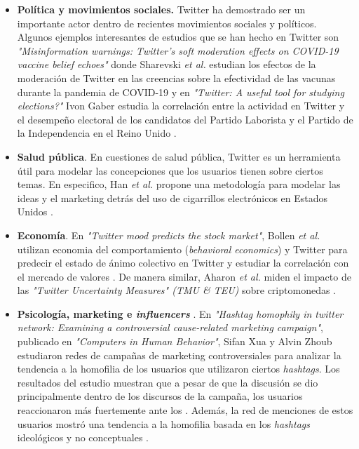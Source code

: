 \begin{itemize}

    \item \textbf{Política y movimientos sociales.} Twitter ha demostrado ser un importante actor dentro de recientes movimientos sociales y políticos. Algunos ejemplos interesantes de estudios que se han hecho en Twitter son \textit{"Misinformation warnings: Twitter’s soft moderation effects on COVID-19 vaccine belief echoes"} donde Sharevski \textit{et al.} estudian los efectos de la moderación de Twitter en las creencias sobre la efectividad de las vacunas durante la pandemia de COVID-19 \cite{sharevski_misinformation_2022} y en \textit{"Twitter: A useful tool for studying elections?"} Ivon Gaber estudia la correlación entre la actividad en Twitter y el desempeño electoral de los candidatos del Partido Laborista y el Partido de la Independencia en el Reino Unido \cite{gaber_twitter_2017}.

    \item \textbf{Salud pública}. En cuestiones de salud pública, Twitter es un herramienta útil para modelar las concepciones que los usuarios tienen sobre ciertos temas. En especifico, Han \textit{et al.} propone una metodología para modelar las ideas y el marketing detrás del uso de cigarrillos electrónicos en Estados Unidos \cite{spiro_exploratory_2016}.

    \item \textbf{Economía}. En \textit{"Twitter mood predicts the stock market"}, Bollen \textit{et al.} utilizan economia del comportamiento (\textit{behavioral economics}) y Twitter para predecir el estado de ánimo colectivo en Twitter y estudiar la correlación con el mercado de valores \cite{bollen_twitter_2011}. De manera similar, Aharon \textit{et al.} miden el impacto de las \textit{"Twitter Uncertainty Measures" (TMU \& TEU)} sobre criptomonedas \cite{aharon_twitter-based_2022}.

    \item \textbf{Psicología, marketing e \textit{influencers} }. En \textit{"Hashtag homophily in twitter network: Examining a controversial cause-related marketing campaign"}, publicado en \textit{"Computers in Human Behavior"}, Sifan Xua y Alvin Zhoub estudiaron redes de campañas de marketing controversiales para analizar la tendencia a la homofilia de los usuarios que utilizaron ciertos \textit{hashtags}. Los resultados del estudio muestran que a pesar de que la discusión se dio principalmente dentro de los discursos de la campaña, los usuarios reaccionaron más fuertemente ante los . Además, la red de menciones de estos usuarios mostró una tendencia a la homofilia basada en los \textit{hashtags} ideológicos y no conceptuales \cite{xu_hashtag_2020}.


\end{itemize}
